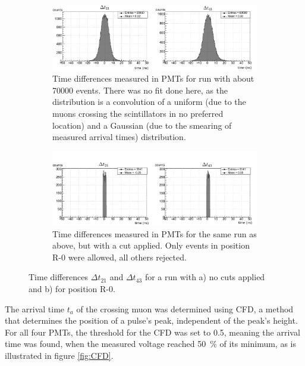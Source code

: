 	\begin{figure}[h]
		\centering
		\begin{subfigure}{\textwidth}
			\includegraphics[width=\textwidth]{pictures/time-differences-uncut.pdf}
			\caption{Time differences measured in \acsp{PMT} for run with about \num{70000} events. There was no fit done here, as the distribution is a convolution of a uniform (due to the muons crossing the scintillators in no preferred location) and a Gaussian (due to the smearing of measured arrival times) distribution.}
			\label{fig:timing-nocut}
		\end{subfigure}
		\begin{subfigure}{\textwidth}
			\includegraphics[width=\textwidth]{pictures/time-differences-cut.pdf}
			\caption{Time differences measured in \acsp{PMT} for the same run as above, but with a cut applied. Only events in position R-0 were allowed, all others rejected.}
		\end{subfigure}
	\caption{Time differences $\Delta t_{21}$ and $\Delta t_{43}$ for a run with a) no cuts applied and b) for position R-0.}
	\label{fig:timing-cut}
	\end{figure}
	
	The arrival time $t_a$ of the crossing muon was determined using \ac{CFD}, a method that determines the position of a pulse's peak, independent of the peak's height. For all four \acsp{PMT}, the threshold for the \ac{CFD} was set to \num{0.5}, meaning the arrival time was found, when the measured voltage reached \SI{50}{\percent} of its minimum, as is illustrated in figure \ref{fig:CFD}. 
	
